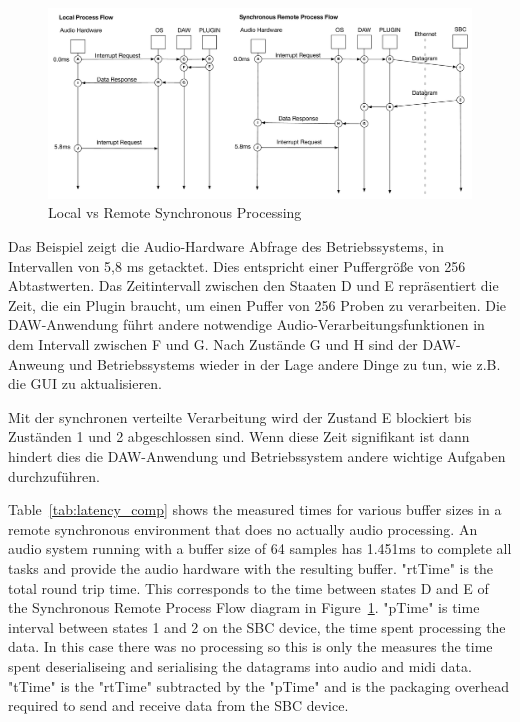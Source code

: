 \begin{figure}[H]
    \centering
    \includegraphics[width=\textwidth]{assets/conclusion/process_flow_compared.pdf}
    \caption{Local vs Remote Synchronous Processing}
    \label{fig:local_vs_remote}
\end{figure}

Das Beispiel zeigt die Audio-Hardware Abfrage des Betriebssystems, in Intervallen von 5,8 ms getacktet. Dies entspricht einer Puffergröße von 256 Abtastwerten. Das Zeitintervall zwischen den Staaten D und E repräsentiert die Zeit, die ein Plugin braucht, um einen Puffer von 256 Proben zu verarbeiten. Die DAW-Anwendung führt andere notwendige Audio-Verarbeitungsfunktionen in dem Intervall zwischen F und G. Nach Zustände G und H sind der DAW-Anweung und Betriebssystems wieder in der Lage andere Dinge zu tun, wie z.B. die GUI zu aktualisieren.

Mit der synchronen verteilte Verarbeitung wird der Zustand E blockiert bis Zuständen 1 und 2 abgeschlossen sind. Wenn diese Zeit signifikant ist dann hindert dies die DAW-Anwendung und Betriebssystem andere wichtige Aufgaben durchzuführen.



Table~\ref{tab:latency_comp} shows the measured times for various buffer sizes in a remote synchronous environment that does no actually audio processing. An audio system running with a buffer size of 64 samples has 1.451ms to complete all tasks and provide the audio hardware with the resulting buffer. "rtTime" is the total round trip time. This corresponds to the time between states D and E of the Synchronous Remote Process Flow diagram in Figure~\ref{fig:local_vs_remote}. "pTime" is time interval between states 1 and 2 on the SBC device, the time spent processing the data. In this case there was no processing so this is only the measures the time spent deserialiseing and serialising the datagrams into audio and midi data. "tTime" is the "rtTime" subtracted by the "pTime" and is the packaging overhead required to send and receive data from the SBC device.

